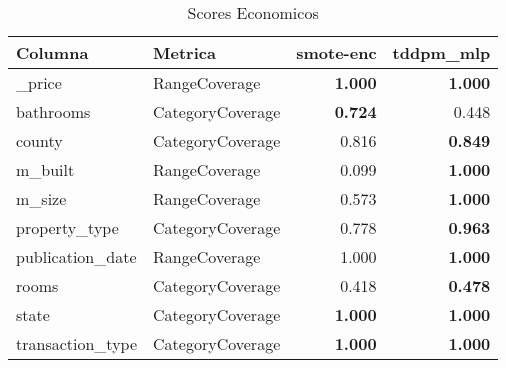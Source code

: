 \begin{table}[H]
\centering
\caption{Scores Economicos}
\label{table-coverage-economicos-b-3}
\begin{tabular}{|l|l|r|r|}
\hline
\rowcolor[gray]{0.8}
Columna & Metrica & smote-enc & tddpm\_mlp \\
\hline \_price & RangeCoverage & \bfseries 1.000 & \bfseries 1.000 \\
\hline bathrooms & CategoryCoverage & \bfseries 0.724 & 0.448 \\
\hline county & CategoryCoverage & 0.816 & \bfseries 0.849 \\
\hline m\_built & RangeCoverage & 0.099 & \bfseries 1.000 \\
\hline m\_size & RangeCoverage & 0.573 & \bfseries 1.000 \\
\hline property\_type & CategoryCoverage & 0.778 & \bfseries 0.963 \\
\hline publication\_date & RangeCoverage & 1.000 & \bfseries 1.000 \\
\hline rooms & CategoryCoverage & 0.418 & \bfseries 0.478 \\
\hline state & CategoryCoverage & \bfseries 1.000 & \bfseries 1.000 \\
\hline transaction\_type & CategoryCoverage & \bfseries 1.000 & \bfseries 1.000 \\
\hline
\end{tabular}
\end{table}
